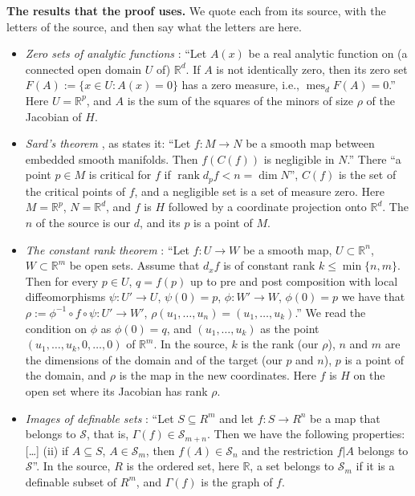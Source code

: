 \documentclass[10pt]{article}
\theoremstyle{definition}
\theoremstyle{remark}
\newcommand{\R}{\mathbb{R}}
\newcommand{\para}[1]{\smallskip\noindent\textbf{#1}\hspace{0.5em}}
\begin{document}
\para{The results that the proof uses.} We quote each from its source, with the letters of the source, and then say what the letters are here.
\begin{itemize}
\item \emph{Zero sets of analytic functions} \citep[Proposition~0]{mityagin2015zero}: ``Let $A(x)$ be a real analytic function on (a connected open domain $U$ of) $\R^d$. If $A$ is not identically zero, then its zero set $F(A) := \{x \in U : A(x) = 0\}$ has a zero measure, i.e., $\operatorname{mes}_d F(A) = 0$.'' Here $U = \R^p$, and $A$ is the sum of the squares of the minors of size $\rho$ of the Jacobian of $H$.
\item \emph{Sard's theorem} \citep{sard1942measure}, as \citet[Theorem~5.27]{benedetti2019lectures} states it: ``Let $f : M \to N$ be a smooth map between embedded smooth manifolds. Then $f(C(f))$ is negligible in $N$.'' There ``a point $p \in M$ is critical for $f$ if $\operatorname{rank} d_pf < n = \dim N$'', $C(f)$ is the set of the critical points of $f$, and a negligible set is a set of measure zero. Here $M = \R^p$, $N = \R^d$, and $f$ is $H$ followed by a coordinate projection onto $\R^d$. The $n$ of the source is our $d$, and its $p$ is a point of $M$.
\item \emph{The constant rank theorem} \citep[Theorem~1.5]{benedetti2019lectures}: ``Let $f : U \to W$ be a smooth map, $U \subset \R^n$, $W \subset \R^m$ be open sets. Assume that $d_xf$ is of constant rank $k \le \min\{n, m\}$. Then for every $p \in U$, $q = f(p)$ up to pre and post composition with local diffeomorphisms $\psi : U' \to U$, $\psi(0) = p$, $\phi : W' \to W$, $\phi(0) = p$ we have that $\rho := \phi^{-1} \circ f \circ \psi : U' \to W'$, $\rho(u_1, \dots, u_n) = (u_1, \dots, u_k)$.'' We read the condition on $\phi$ as $\phi(0) = q$, and $(u_1, \dots, u_k)$ as the point $(u_1, \dots, u_k, 0, \dots, 0)$ of $\R^m$. In the source, $k$ is the rank (our $\rho$), $n$ and $m$ are the dimensions of the domain and of the target (our $p$ and $n$), $p$ is a point of the domain, and $\rho$ is the map in the new coordinates. Here $f$ is $H$ on the open set where its Jacobian has rank $\rho$.
\item \emph{Images of definable sets} \citep[Chapter~1, Lemma~(2.3)]{vandendries1998tame}: ``Let $S \subseteq R^m$ and let $f : S \to R^n$ be a map that belongs to $\mathcal S$, that is, $\Gamma(f) \in \mathcal S_{m+n}$. Then we have the following properties: [\dots] (ii) if $A \subseteq S$, $A \in \mathcal S_m$, then $f(A) \in \mathcal S_n$ and the restriction $f|A$ belongs to $\mathcal S$''. In the source, $R$ is the ordered set, here $\R$, a set belongs to $\mathcal S_m$ if it is a definable subset of $R^m$, and $\Gamma(f)$ is the graph of $f$.

\end{itemize}
\end{document}
